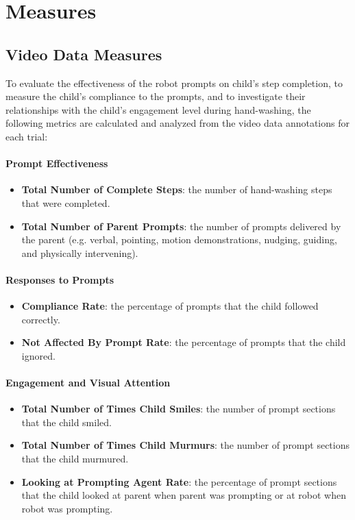 \documentclass{ut-thesis}
\begin{document}
\section{Measures}
\label{sec:measures}

\subsection{Video Data Measures}
To evaluate the effectiveness of the robot prompts on child's step completion, to measure the child's compliance to the prompts, and to investigate their relationships with the child's engagement level during hand-washing, the following metrics are calculated and analyzed from the video data annotations for each trial:


\paragraph{Prompt Effectiveness}
\begin{itemize}
	\item \textbf{Total Number of Complete Steps}: the number of hand-washing steps that were completed.
	\item \textbf{Total Number of Parent Prompts}: the number of prompts delivered by the parent (e.g. verbal, pointing, motion demonstrations, nudging, guiding, and physically intervening).
\end{itemize}

\paragraph{Responses to Prompts}
\begin{itemize}
	\item \textbf{Compliance Rate}: the percentage of prompts that the child followed correctly.
	\item \textbf{Not Affected By Prompt Rate}: the percentage of prompts that the child ignored.
\end{itemize}

\paragraph{Engagement and Visual Attention}
\begin{itemize}
	\item \textbf{Total Number of Times Child Smiles}: the number of prompt sections that the child smiled.
	\item \textbf{Total Number of Times Child Murmurs}: the number of prompt sections that the child murmured.
	\item \textbf{Looking at Prompting Agent Rate}: the percentage of prompt sections that the child looked at parent when parent was prompting or at robot when robot was prompting.
\end{itemize}
\end{document}
